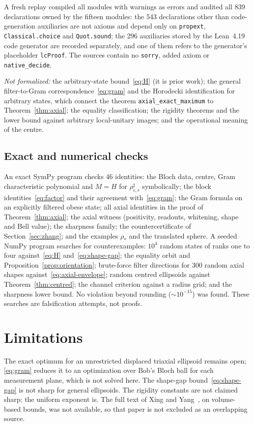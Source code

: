 \documentclass[11pt]{article}
\theoremstyle{remark}\newtheorem{remark}[theorem]{Remark}
\begin{document}
A fresh replay compiled all modules with warnings as errors and audited all
839 declarations owned by the fifteen modules: the 543 declarations other than
code-generation auxiliaries are not axioms and depend only on
\texttt{propext}, \texttt{Classical.choice} and \texttt{Quot.sound}; the 296
auxiliaries stored by the Lean~4.19 code generator are recorded separately,
and one of them refers to the generator's placeholder \texttt{lcProof}. The sources contain no
\texttt{sorry}, added axiom or \texttt{native\_decide}.

\emph{Not formalized:} the arbitrary-state bound~\eqref{eq:H} (it is prior
work); the general filter-to-Gram correspondence~\eqref{eq:gram} and the
Horodecki identification for arbitrary states, which connect the theorem
\texttt{axial\_\allowbreak exact\_\allowbreak maximum} to Theorem~\ref{thm:axial}; the equality
classification; the rigidity theorems and the lower bound against arbitrary
local-unitary images; and the operational meaning of the centre.

\subsection{Exact and numerical checks}
An exact SymPy program checks 46 identities: the Bloch data, centre, Gram
characteristic polynomial and $M=H$ for $\rho^\sharp_{c,r}$ symbolically; the
block identities~\eqref{eq:factor} and their agreement with~\eqref{eq:gram};
the Gram formula on an explicitly filtered obese state; all axial identities
in the proof of Theorem~\ref{thm:axial}; the axial witness (positivity,
readouts, whitening, shape and Bell value); the sharpness family; the
countercertificate of Section~\ref{sec:zhang}; and the examples $\rho_*$ and
the translated sphere. A seeded NumPy program searches for counterexamples:
$10^4$ random states of ranks one to four against~\eqref{eq:H}
and~\eqref{eq:shape-gap}; the equality orbit and
Proposition~\ref{prop:orientation}; brute-force filter directions for 300
random axial shapes against~\eqref{eq:axial-envelope}; random centred
ellipsoids against Theorem~\ref{thm:centred}; the channel criterion against a
radius grid; and the sharpness lower bound. No violation beyond rounding
($\sim10^{-15}$) was found. These searches are falsification attempts, not
proofs.

\section{Limitations}\label{sec:limits}
The exact optimum for an unrestricted displaced triaxial ellipsoid remains
open; \eqref{eq:gram} reduces it to an optimization over Bob's Bloch ball for
each measurement plane, which is not solved here. The shape-gap
bound~\eqref{eq:shape-gap} is not sharp for general ellipsoids. The rigidity
constants are not claimed sharp; the uniform exponent is. The full text of
Xing and Yang~\cite{xing}, on volume-based bounds, was not available, so that
paper is not excluded as an overlapping source.
\end{document}
